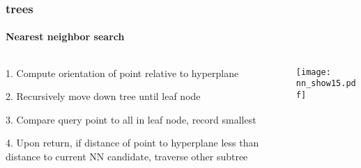 \begin{frame}[noframenumbering]
  \frametitle{\kd trees}
  \framesubtitle{Nearest neighbor search}
  \begin{columns}[T]
    \begin{column}{.5\textwidth}
      \begin{block}{}%
        {\color{white} 1.\hspace{1mm} Compute orientation of point relative to hyperplane
          \\\vspace{0.4cm}
        
        2.\hspace{1mm} Recursively move down tree until leaf node\\\vspace{0.4cm}

        3.\hspace{1mm} Compare query point to all in leaf node, record smallest\\\vspace{0.4cm}
    
        {\color{graph-red}
        4.\hspace{1mm} Upon return, if distance of point to hyperplane less than distance to current
    NN candidate, traverse other subtree}}
      \end{block}
    \end{column}
    \begin{column}{.5\textwidth}
      \begin{block}{}
        \texttt{[image: nn\_show15.pdf]}
      \end{block}
    \end{column}
  \end{columns}
\end{frame}
